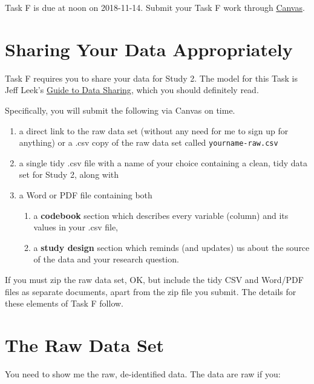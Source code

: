 \documentclass[]{book}
\providecommand{\tightlist}{%
  \setlength{\itemsep}{0pt}\setlength{\parskip}{0pt}}
\theoremstyle{definition}
\theoremstyle{definition}
\theoremstyle{definition}
\theoremstyle{remark}
\begin{document}
Task F is due at noon on 2018-11-14. Submit your Task F work through
\href{https://canvas.case.edu/}{Canvas}.

\hypertarget{sharing-your-data-appropriately}{%
\section{Sharing Your Data
Appropriately}\label{sharing-your-data-appropriately}}

Task F requires you to share your data for Study 2. The model for this
Task is Jeff Leek's \href{https://github.com/jtleek/datasharing}{Guide
to Data Sharing}, which you should definitely read.

Specifically, you will submit the following via Canvas on time.

\begin{enumerate}
\def\labelenumi{\arabic{enumi}.}
\tightlist
\item
  a direct link to the raw data set (without any need for me to sign up
  for anything) or a .csv copy of the raw data set called
  \texttt{yourname-raw.csv}
\item
  a single tidy .csv file with a name of your choice containing a clean,
  tidy data set for Study 2, along with
\item
  a Word or PDF file containing both

  \begin{enumerate}
  \def\labelenumii{\alph{enumii}.}
  \tightlist
  \item
    a \textbf{codebook} section which describes every variable (column)
    and its values in your .csv file,
  \item
    a \textbf{study design} section which reminds (and updates) us about
    the source of the data and your research question.
  \end{enumerate}
\end{enumerate}

If you must zip the raw data set, OK, but include the tidy CSV and
Word/PDF files as separate documents, apart from the zip file you
submit. The details for these elements of Task F follow.

\hypertarget{the-raw-data-set}{%
\section{The Raw Data Set}\label{the-raw-data-set}}

You need to show me the raw, de-identified data. The data are raw if
you:
\end{document}
